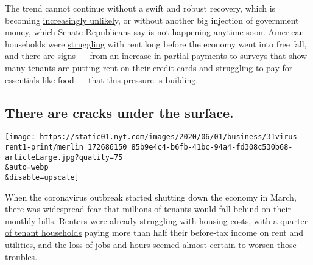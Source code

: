 The trend cannot continue without a swift and robust recovery, which is
becoming
\href{https://www.nytimes.com/2020/05/11/upshot/virus-lasting-economic-effects.html}{increasingly
unlikely}, or without another big injection of government money, which
Senate Republicans say is not happening anytime soon. American
households were
\href{https://www.mprnews.org/story/2020/01/31/report-more-middleincome-renters-burdened-by-housing-costs}{struggling}
with rent long before the economy went into free fall, and there are
signs --- from an increase in partial payments to surveys that show many
tenants are
\href{https://www.gozego.com/articles/may-rent-payment-data-reveals-april-trends-have-continued-as-a-result-of-covid-19/}{putting
rent} on their
\href{https://www.wsj.com/articles/out-of-work-apartment-tenants-putting-monthly-rent-on-plastic-11586966251}{credit
cards} and struggling to
\href{https://www.urban.org/urban-wire/when-people-cant-pay-their-rent-what-comes-next}{pay
for essentials} like food --- that this pressure is building.

\hypertarget{there-are-cracks-under-the-surface}{%
\subsection{There are cracks under the
surface.}\label{there-are-cracks-under-the-surface}}

\texttt{[image: https://static01.nyt.com/images/2020/06/01/business/31virus-rent1-print/merlin\_172686150\_85b9e4c4-b6fb-41bc-94a4-fd308c530b68-articleLarge.jpg?quality=75\\\&auto=webp\\\&disable=upscale]}

When the coronavirus outbreak started shutting down the economy in
March, there was widespread fear that millions of tenants would fall
behind on their monthly bills. Renters were already struggling with
housing costs, with a
\href{https://www.jchs.harvard.edu/sites/default/files/Harvard_JCHS_Americas_Rental_Housing_2020.pdf}{quarter
of tenant households} paying more than half their before-tax income on
rent and utilities, and the loss of jobs and hours seemed almost certain
to worsen those troubles.

